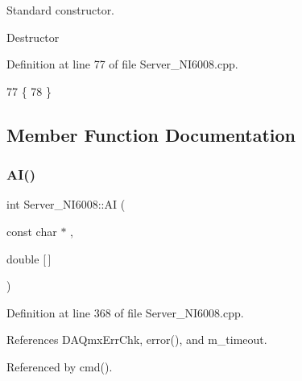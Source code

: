 Standard constructor. 

Destructor 

Definition at line 77 of file Server\+\_\+\+N\+I6008.\+cpp.


\begin{DoxyCode}
77                              \{
78 \}
\end{DoxyCode}


\subsection{Member Function Documentation}
\mbox{\label{classServer__NI6008_a94705879717d5bcf129899e96be81675}} 
\subsubsection{\texorpdfstring{A\+I()}{AI()}}
{\footnotesize\ttfamily int Server\+\_\+\+N\+I6008\+::\+AI (\begin{DoxyParamCaption}\item[{const char $\ast$}]{,  }\item[{double}]{\mbox{[}$\,$\mbox{]} }\end{DoxyParamCaption})}



Definition at line 368 of file Server\+\_\+\+N\+I6008.\+cpp.



References D\+A\+Qmx\+Err\+Chk, error(), and m\+\_\+timeout.



Referenced by cmd().


